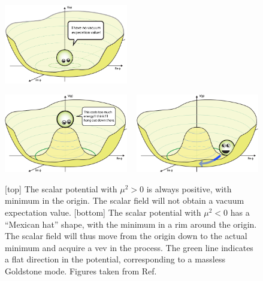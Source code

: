 \begin{figure}[htb]
  \centering
  \includegraphics[width=0.48\textwidth]{figures/standardmodel/BoringPotential}
  
  \vspace{2eM}
  
  \includegraphics[width=0.48\textwidth]{figures/standardmodel/Higgs-Potential-lookdown}
  ~
  \includegraphics[width=0.48\textwidth]{figures/standardmodel/Higgs-Potential-Goldstone}
  \caption{ [top] The scalar potential with $\mu^2 > 0$ is always positive, with minimum in the
origin. The scalar field will not obtain a vacuum expectation value. 
  [bottom] The scalar potential with $\mu^2 < 0$ has a ``Mexican hat'' shape, with the minimum in a
rim around the origin. The scalar field will thus move from the origin down to the actual minimum
and acquire a vev in the process. The green line indicates a flat direction in the potential,
corresponding to a massless Goldstone mode.
  Figures taken from Ref.~\cite{Higgs_potential}
  \label{fig:Higgs_potential}}
\end{figure}

